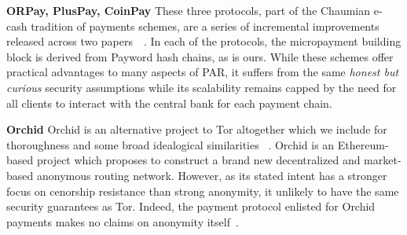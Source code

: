 \textbf{ORPay, PlusPay, CoinPay} These three protocols, part of the Chaumian
e-cash tradition of payments schemes, are a series of incremental improvements
released across two papers~\cite{chen2009xpay}~\cite{carbunar2012tipping}. In
each of the protocols, the micropayment building block is derived from Payword
hash chains, as is ours. While these schemes offer practical advantages to many
aspects of PAR, it suffers from the same \emph{honest but curious} security
assumptions while its scalability remains capped by the need for all clients to
interact with the central bank for each payment chain.

\textbf{Orchid} Orchid is an alternative project to Tor altogether which we
include for thoroughness and some broad idealogical similarities
~\cite{salamon2018orchid}. Orchid is an Ethereum-based project which proposes to
construct a brand new decentralized and market-based anonymous routing
network. However, as its stated intent has a stronger focus on cenorship
resistance than strong anonymity, it unlikely to have the same security
guarantees as Tor. Indeed, the payment protocol enlisted for Orchid payments
makes no claims on anonymity itself~\cite{pass2015micropayments}.